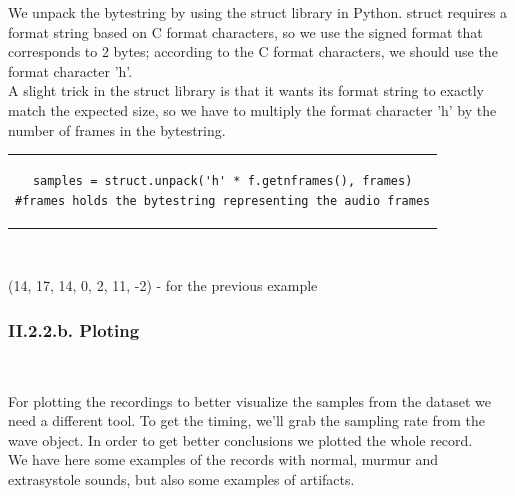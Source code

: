 \documentclass[11pt, a4papper]{report}
\theoremstyle{plain}
\theoremstyle{definition}
\theoremstyle{definition}
\theoremstyle{proposition}
\begin{document}
We unpack the bytestring by using the struct library in Python. struct requires a format string based on C format characters, so we use the signed format that corresponds to 2 bytes; according to the C format characters, we should use the format character 'h'.
\\

A slight trick in the struct library is that it wants its format string to exactly match the expected size, so we have to multiply the format character 'h' by the number of frames in the bytestring.

\begin{center}
\begin{tabular}{c}
\begin{lstlisting}
samples = struct.unpack('h' * f.getnframes(), frames)
#frames holds the bytestring representing the audio frames
\end{lstlisting}
\end{tabular}
\

(14, 17, 14, 0, 2, 11, -2) - for the previous example
\end{center}


\subsubsection*{II.2.2.b. Ploting}

\

For plotting the recordings to better visualize the samples from the dataset we need a different tool. To get the timing, we'll grab the sampling rate from the wave object. In order to get better conclusions we plotted the whole record.
\\

We have here some examples of the records with normal, murmur and extrasystole sounds, but also some examples of artifacts.
\
\end{document}
